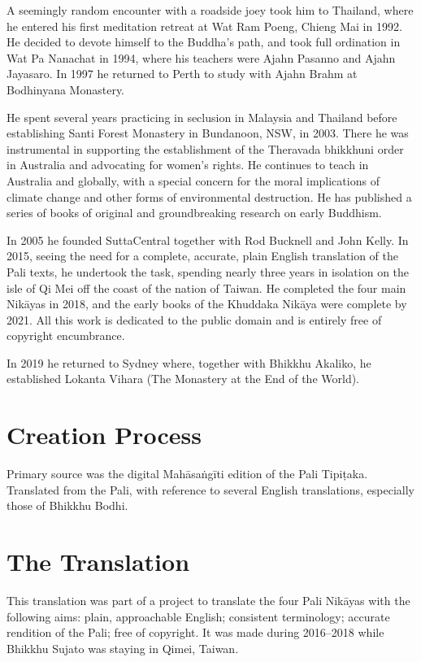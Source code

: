 \documentclass[12pt,openany]{book}%
\begin{document}
A seemingly random encounter with a roadside joey took him to Thailand, where he entered his first meditation retreat at Wat Ram Poeng, Chieng Mai in 1992. He decided to devote himself to the Buddha’s path, and took full ordination in Wat Pa Nanachat in 1994, where his teachers were Ajahn Pasanno and Ajahn Jayasaro. In 1997 he returned to Perth to study with Ajahn Brahm at Bodhinyana Monastery. 

He spent several years practicing in seclusion in Malaysia and Thailand before establishing Santi Forest Monastery in Bundanoon, NSW, in 2003. There he was instrumental in supporting the establishment of the Theravada bhikkhuni order in Australia and advocating for women’s rights. He continues to teach in Australia and globally, with a special concern for the moral implications of climate change and other forms of environmental destruction. He has published a series of books of original and groundbreaking research on early Buddhism. 

In 2005 he founded SuttaCentral together with Rod Bucknell and John Kelly. In 2015, seeing the need for a complete, accurate, plain English translation of the Pali texts, he undertook the task, spending nearly three years in isolation on the isle of Qi Mei off the coast of the nation of Taiwan. He completed the four main \textsanskrit{Nikāyas} in 2018, and the early books of the Khuddaka \textsanskrit{Nikāya} were complete by 2021. All this work is dedicated to the public domain and is entirely free of copyright encumbrance. 

In 2019 he returned to Sydney where, together with Bhikkhu Akaliko, he established Lokanta Vihara (The Monastery at the End of the World). 

\section*{Creation Process}

Primary source was the digital \textsanskrit{Mahāsaṅgīti} edition of the Pali \textsanskrit{Tipiṭaka}. Translated from the Pali, with reference to several English translations, especially those of Bhikkhu Bodhi.

\section*{The Translation}

This translation was part of a project to translate the four Pali \textsanskrit{Nikāyas} with the following aims: plain, approachable English; consistent terminology; accurate rendition of the Pali; free of copyright. It was made during 2016–2018 while Bhikkhu Sujato was staying in Qimei, Taiwan.
\end{document}

